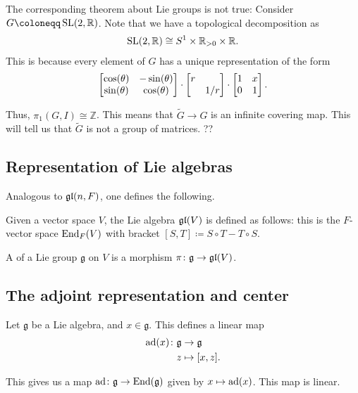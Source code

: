 \documentclass[12pt]{article}
\begin{document}
\begin{rem}
	The corresponding theorem about Lie groups is not true: Consider $G \coloneqq \SL(2, \mathbb{R})$. 
	Note that we have a topological decomposition as
	\begin{align*} 
		\operatorname{SL}(2, \mathbb{R}) \cong S^{1} \times \mathbb{R}_{> 0} \times \mathbb{R}.
	\end{align*}
	This is because every element of $G$ has a unique representation of the form
	\begin{equation*} 
		\begin{bmatrix} \cos(\theta) & -\sin(\theta) \\ \sin(\theta) & \cos(\theta) \end{bmatrix} \cdot \begin{bmatrix} r &  \\  & 1/r \end{bmatrix} \cdot \begin{bmatrix} 1 & x \\ 0 & 1 \end{bmatrix}.
	\end{equation*}

	Thus, $\pi_{1}(G, I) \cong \mathbb{Z}$. 
	This means that $\widetilde{G} \to G$ is an infinite covering map. 
	This will tell us that $\widetilde{G}$ is not a group of matrices. ??
\end{rem}

\subsection{Representation of Lie algebras}

Analogous to $\mathfrak{gl}(n, F)$, one defines the following.
\begin{defn}
	Given a vector space $V$, the Lie algebra $\mathfrak{gl}(V)$ is defined as follows: this is the $F$-vector space $\operatorname{End}_{F}(V)$ with bracket $[S, T] \coloneqq S \circ T - T \circ S$.
\end{defn}

\begin{defn}
	A  of a Lie group $\mathfrak{g}$ on $V$ is a morphism $\pi \colon \mathfrak{g} \to \mathfrak{gl}(V)$.
\end{defn}

\subsection{The adjoint representation and center}

Let $\mathfrak{g}$ be a Lie algebra, and $x \in \mathfrak{g}$. 
This defines a linear map 
\begin{align*} 
	\operatorname{ad}(x) \colon \mathfrak{g} & \to \mathfrak{g} \\
	z & \mapsto [x, z].
\end{align*}

This gives us a map $\operatorname{ad} \colon \mathfrak{g} \to \operatorname{End}(\mathfrak{g})$ given by $x \mapsto \operatorname{ad}(x)$. 
This map is linear.
\end{document}
